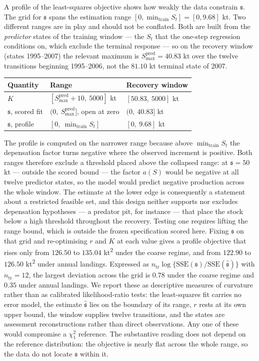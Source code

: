 \documentclass[11pt]{article}
\begin{document}
A profile of the least-squares objective shows how weakly the data
constrain \(\mathfrak s\). The grid for \(\mathfrak s\) spans the estimation range
\([0, \min_{\mathrm{train}} S_t] = [0, 9.68]\) kt. Two different ranges are in play and should not be conflated. Both are
built from the \emph{predictor} states of the training window --- the
\(S_t\) that the one-step regression conditions on, which exclude the
terminal response --- so on the recovery window (states 1995--2007) the
relevant maximum is \(S^{\mathrm{pred}}_{\max} = 40.83\) kt over the
twelve transitions beginning 1995--2006, not the \(81.10\) kt terminal
state of 2007.

\begin{longtable}[]{@{}lll@{}}
\toprule\noalign{}
Quantity & Range & Recovery window \\
\midrule\noalign{}
\endhead
\bottomrule\noalign{}
\endlastfoot
\(K\) & \([S^{\mathrm{pred}}_{\max}+10,\ 5000]\) kt & \([50.83,\ 5000]\) kt \\
\(\mathfrak s\), scored fit & \((0,\ S^{\mathrm{pred}}_{\max}]\), open at zero & \((0,\ 40.83]\) kt \\
\(\mathfrak s\), profile & \([0,\ \min_{\mathrm{train}} S_t]\) & \([0,\ 9.68]\) kt \\
\end{longtable}

The profile is computed on the narrower range because above
\(\min_{\mathrm{train}} S_t\) the depensation factor turns negative
where the observed increment is positive. Both ranges therefore exclude
a threshold placed above the collapsed range: at \(\mathfrak s = 50\) kt
--- outside the scored bound --- the factor \(a(S)\) would be negative
at all twelve predictor states, so the model would predict negative
production across the whole window. The estimate at the lower edge is
consequently a statement about a restricted feasible set, and this
design neither supports nor excludes depensation hypotheses --- a
predator pit, for instance --- that place the stock below a high
threshold throughout the recovery. Testing one requires lifting the
range bound, which is outside the frozen specification scored here. Fixing
\(\mathfrak s\) on that grid and re-optimising \(r\) and \(K\) at each
value gives a profile objective that rises only from \(126.50\) to
\(135.04\) kt\textsuperscript{2} under the coarse regime, and from
\(122.90\) to \(126.50\) kt\textsuperscript{2} under annual landings. Expressed as
\(n_{\mathrm{tr}}\log\{\mathrm{SSE}(\mathfrak s)/
\mathrm{SSE}(\hat{\mathfrak s})\}\) with \(n_{\mathrm{tr}}=12\), the
largest deviation across the grid is \(0.78\) under the coarse regime
and \(0.35\) under annual landings. We report these as descriptive
measures of curvature rather than as calibrated likelihood-ratio tests:
the least-squares fit carries no error model, the estimate
\(\hat{\mathfrak s}\) lies on the boundary of its range, \(r\) rests
at its own upper bound, the window supplies twelve transitions, and the
states are assessment reconstructions rather than direct observations.
Any one of these would compromise a \(\chi^2_1\) reference. The
substantive reading does not depend on the reference distribution: the
objective is nearly flat across the whole range, so the data do not
locate \(\mathfrak s\) within it.
\end{document}
